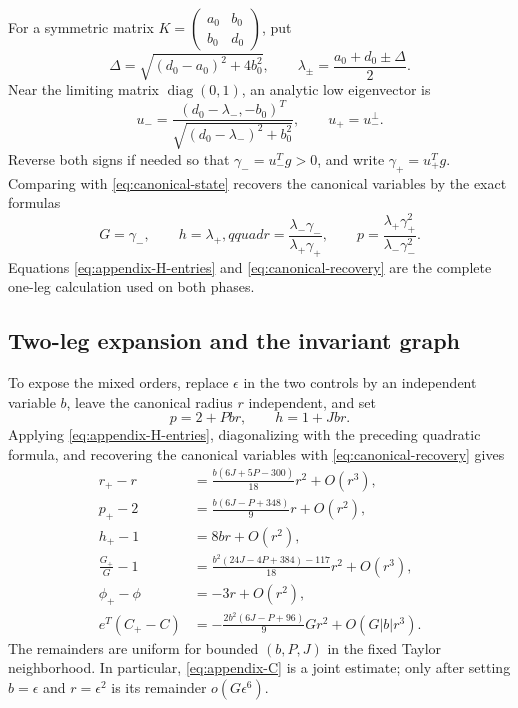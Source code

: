 \documentclass[smallextended,envcountsame]{svjour3}
\begin{document}
For a symmetric matrix
$K=\left(\begin{smallmatrix}a_0&b_0\\b_0&d_0\end{smallmatrix}\right)$,
put
\[
\Delta=\sqrt{(d_0-a_0)^2+4b_0^2},\qquad
\lambda_\pm=\frac{a_0+d_0\pm\Delta}{2}.
\]
Near the limiting matrix $\operatorname{diag}(0,1)$, an analytic low
eigenvector is
\[
u_-=
\frac{(d_0-\lambda_-,-b_0)^T}
{\sqrt{(d_0-\lambda_-)^2+b_0^2}},
\qquad u_+=u_-^\perp.
\]
Reverse both signs if needed so that $\gamma_-=u_-^Tg>0$, and write
$\gamma_+=u_+^Tg$.  Comparing with \eqref{eq:canonical-state} recovers the
canonical variables by the exact formulas
\begin{equation}\label{eq:canonical-recovery}
G=\gamma_-,\qquad h=\lambda_+,qquad
r=\frac{\lambda_-\gamma_-}{\lambda_+\gamma_+},
\qquad
p=\frac{\lambda_+\gamma_+^2}{\lambda_-\gamma_-^2}.
\end{equation}
Equations \eqref{eq:appendix-H-entries} and
\eqref{eq:canonical-recovery} are the complete one-leg calculation used on
both phases.

\subsection{Two-leg expansion and the invariant graph}

To expose the mixed orders, replace $\epsilon$ in the two controls by an
independent variable $b$, leave the canonical radius $r$ independent, and set
\[
p=2+Pbr,\qquad h=1+Jbr.
\]
Applying \eqref{eq:appendix-H-entries}, diagonalizing with the preceding
quadratic formula, and recovering the canonical variables with
\eqref{eq:canonical-recovery} gives
\begin{align}
r_+-r
 &=\frac{b(6J+5P-300)}{18}r^2+O(r^3),
\label{eq:appendix-r}\\
p_+-2
 &=\frac{b(6J-P+348)}9r+O(r^2),
\label{eq:appendix-p}\\
h_+-1&=8br+O(r^2),
\label{eq:appendix-h}\\
\frac{G_+}{G}-1
 &=\frac{b^2(24J-4P+384)-117}{18}r^2+O(r^3),
\label{eq:appendix-G}\\
\phi_+-\phi&=-3r+O(r^2),
\label{eq:appendix-phi}\\
e^T(C_+-C)
 &=-\frac{2b^2(6J-P+96)}9Gr^2+O(G|b|r^3).
\label{eq:appendix-C}
\end{align}
The remainders are uniform for bounded $(b,P,J)$ in the fixed Taylor
neighborhood.  In particular, \eqref{eq:appendix-C} is a joint estimate; only
after setting $b=\epsilon$ and $r=\epsilon^2$ is its remainder
$o(G\epsilon^6)$.
\end{document}
